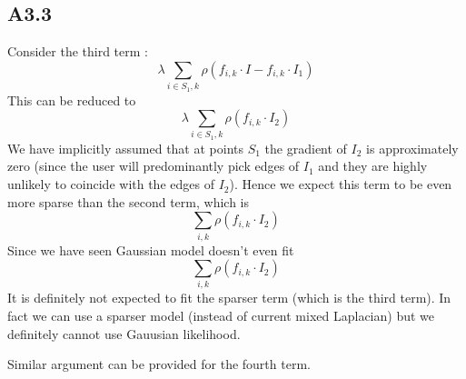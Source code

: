 \documentclass{article}
\begin{document}
\subsection*{A3.3}
Consider the third term :
$$\lambda \sum_{i \in S_1,k} \rho(f_{i,k}\cdot I - f_{i,k}\cdot I_1)$$
This can be reduced to
$$\lambda \sum_{i \in S_1,k} \rho(f_{i,k}\cdot I_2)$$
We have implicitly assumed that at points $S_1$ the gradient of $I_2$ is approximately zero (since the user will predominantly pick edges of $I_1$ and they are highly unlikely to coincide with the edges of $I_2$). Hence we expect this term to be even more sparse than the second term, which is $$\sum_{i,k} \rho(f_{i,k} \cdot I_2)$$
Since we have seen Gaussian model doesn't even fit $$\sum_{i,k} \rho(f_{i,k} \cdot I_2)$$ It is definitely not expected to fit the sparser term (which is the third term). In fact we can use a sparser model (instead of current mixed Laplacian) but we definitely cannot use Gauusian likelihood.

Similar argument can be provided for the fourth term. 
\end{document}
